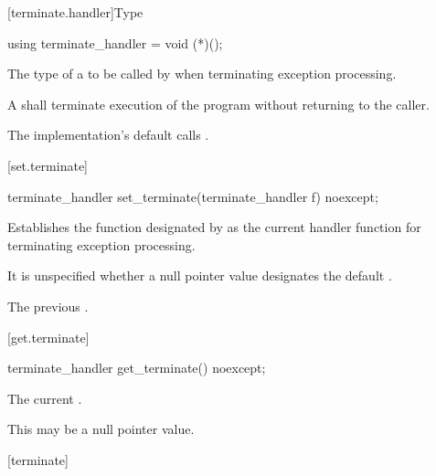 [terminate.handler]{Type }

%
\begin{itemdecl}
using terminate_handler = void (*)();
\end{itemdecl}

\begin{itemdescr}
\pnum
The type of a
to be called by
%
when terminating exception processing.

\pnum
\required
A  shall
terminate execution of the program without returning to the caller.

\pnum
{}
The implementation's default  calls
.%
%
\end{itemdescr}

[set.terminate]{}

%
\begin{itemdecl}
terminate_handler set_terminate(terminate_handler f) noexcept;
\end{itemdecl}

\begin{itemdescr}
\pnum
\effects
Establishes the function designated by  as the current
handler function for terminating exception processing.

\pnum
\remarks It is unspecified whether a null pointer value designates the default
.

\pnum
\returns
The previous .
\end{itemdescr}

[get.terminate]{}

%
\begin{itemdecl}
terminate_handler get_terminate() noexcept;
\end{itemdecl}

\begin{itemdescr}
\pnum
\returns The current .
\begin{note} This may be a null pointer value. \end{note}
\end{itemdescr}

[terminate]{}

